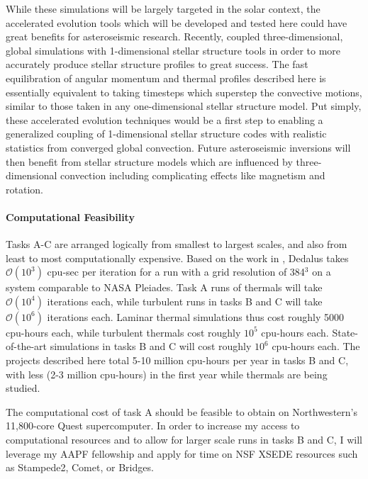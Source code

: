 \documentclass[11pt, preprint]{aastex}
\begin{document}
While these simulations will be largely targeted in the solar context, the accelerated evolution tools which will be developed and tested here could have great benefits for asteroseismic research.
Recently, \citet{jorgensen&weiss2019} coupled three-dimensional, global simulations with 1-dimensional stellar structure tools in order to more accurately produce stellar structure profiles to great success.
The fast equilibration of angular momentum and thermal profiles described here is essentially equivalent to taking timesteps which superstep the convective motions, similar to those taken in any one-dimensional stellar structure model.
Put simply, these accelerated evolution techniques would be a first step to enabling a generalized coupling of 1-dimensional stellar structure codes with realistic statistics from converged global convection.
Future asteroseismic inversions will then benefit from stellar structure models which are influenced by three-dimensional convection including complicating effects like magnetism and rotation.

\paragraph{Computational Feasibility}
\label{sct:feasibility}
Tasks A-C are arranged logically from smallest to largest scales, and also from least to most computationally expensive.
Based on the work in \citet{anders&brown2017, anders&all2018, anders&all2019, andersLB2019}, Dedalus takes $\mathcal{O}(10^3)$ cpu-sec per iteration for a run with a grid resolution of 384$^3$ on a system comparable to NASA Pleiades.
Task A runs of thermals will take $\mathcal{O}(10^4)$ iterations each, while turbulent runs in tasks B and C will take $\mathcal{O}(10^6)$ iterations each.
Laminar thermal simulations thus cost roughly 5000 cpu-hours each, while turbulent thermals cost roughly $10^5$ cpu-hours each.
State-of-the-art simulations in tasks B and C will cost roughly $10^6$ cpu-hours each.
The projects described here total 5-10 million cpu-hours per year in tasks B and C, with less (2-3 million cpu-hours) in the first year while thermals are being studied.

The computational cost of task A should be feasible to obtain on Northwestern's 11,800-core Quest supercomputer.
In order to increase my access to computational resources and to allow for larger scale runs in tasks B and C, I will leverage my AAPF fellowship and apply for time on NSF XSEDE resources such as Stampede2, Comet, or Bridges.
\end{document}
